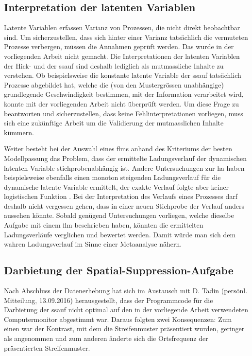 \documentclass[11pt, twoside, a4paper]{book}		%
\begin{document}
\subsection{Interpretation der latenten Variablen}

Latente Variablen erfassen Varianz von Prozessen, die nicht direkt beobachtbar sind. Um sicherzustellen, dass sich hinter einer Varianz tatsächlich die vermuteten Prozesse verbergen, müssen die Annahmen geprüft werden. Das wurde in der vorliegenden Arbeit nicht gemacht. Die Interpretationen der latenten Variablen der Hick- und der \gls{ssauf} sind deshalb lediglich als mutmassliche Inhalte zu verstehen. Ob beispielsweise die konstante latente Variable der \gls{ssauf} tatsächlich Prozesse abgebildet hat, welche die (von den Mustergrössen unabhängige) grundlegende Geschwindigkeit bestimmen, mit der Information verarbeitet wird, konnte mit der vorliegenden Arbeit nicht überprüft werden. Um diese Frage zu beantworten und sicherzustellen, dass keine Fehlinterpretationen vorliegen, muss sich eine zukünftige Arbeit um die Validierung der mutmasslichen Inhalte kümmern.

Weiter besteht bei der Auswahl eines \gls{flm}s anhand des Kriteriums der besten Modellpassung das Problem, dass der ermittelte Ladungsverlauf der dynamischen latenten Variable stichprobenabhängig ist. 
Andere Untersuchungen zur \gls{ha} haben beispielsweise ebenfalls einen monoton steigenden Ladungsverlauf für die dynamische latente Variable ermittelt, der exakte Verlauf folgte aber keiner logistischen Funktion \citep{Borter2013, Pahud2017, Schweizer2006b}. Bei der Interpretation des Verlaufs eines Prozesses darf deshalb nicht vergessen gehen, dass in einer neuen Stichprobe der Verlauf anders aussehen könnte. Sobald genügend Untersuchungen vorliegen, welche dieselbe Aufgabe mit einem \gls{flm} beschrieben haben, könnten die ermittelten Ladungsverläufe verglichen und bewertet werden. Damit würde man sich dem wahren Ladungsverlauf im Sinne einer Metaanalyse nähern.




\subsection{Darbietung der Spatial-Suppression-Aufgabe}


Nach Abschluss der Datenerhebung hat sich im Austausch mit D. Tadin (persönl. Mitteilung, 13.09.2016) herausgestellt, dass der  Programmcode für die Darbietung der \gls{ssauf} nicht optimal auf den in der vorliegende Arbeit verwendeten Computermonitor abgestimmt war. Daraus folgten zwei Konsequenzen: Zum einen war der Kontrast, mit dem die Streifenmuster präsentiert wurden, geringer als angenommen und zum anderen änderte sich die Ortsfrequenz der präsentierten Streifenmuster.
\end{document}
